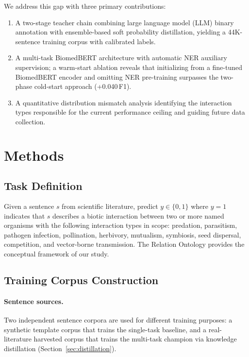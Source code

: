 \documentclass[11pt]{article}
\begin{document}
We address this gap with three primary contributions:
\begin{enumerate}
    \item A two-stage teacher chain combining large language model (LLM)
    binary annotation with ensemble-based soft probability distillation, yielding a
    44K-sentence training corpus with calibrated labels.
    \item A multi-task BiomedBERT architecture with automatic NER auxiliary
    supervision; a warm-start ablation reveals that initializing from a
    fine-tuned BiomedBERT encoder and omitting NER pre-training surpasses
    the two-phase cold-start approach (+0.040\,F1).
    \item A quantitative distribution mismatch analysis identifying the
    interaction types responsible for the current performance ceiling and
    guiding future data collection.
\end{enumerate}

\section{Methods}
\label{sec:methods}

\subsection{Task Definition}

Given a sentence $s$ from scientific literature, predict $y \in \{0, 1\}$
where $y=1$ indicates that $s$ describes a biotic interaction between two
or more named organisms with the following interaction types in scope: predation, parasitism,
pathogen infection, pollination, herbivory, mutualism, symbiosis, seed
dispersal, competition, and vector-borne transmission. 
The Relation Ontology provides the conceptual framework of our study.


\subsection{Training Corpus Construction}
\label{sec:data}

\paragraph{Sentence sources.}
Two independent sentence corpora are used for different training
purposes: a synthetic template corpus that trains the single-task
baseline, and a real-literature harvested corpus that trains the
multi-task champion via knowledge distillation (Section~\ref{sec:distillation}).
\end{document}
